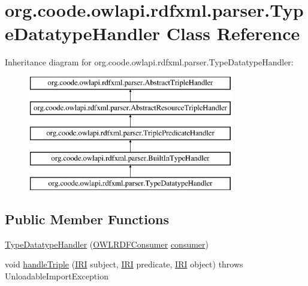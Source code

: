 \hypertarget{classorg_1_1coode_1_1owlapi_1_1rdfxml_1_1parser_1_1_type_datatype_handler}{\section{org.\-coode.\-owlapi.\-rdfxml.\-parser.\-Type\-Datatype\-Handler Class Reference}
\label{classorg_1_1coode_1_1owlapi_1_1rdfxml_1_1parser_1_1_type_datatype_handler}
}
Inheritance diagram for org.\-coode.\-owlapi.\-rdfxml.\-parser.\-Type\-Datatype\-Handler\-:\begin{figure}[H]
\begin{center}
\leavevmode
\includegraphics[height=5.000000cm]{classorg_1_1coode_1_1owlapi_1_1rdfxml_1_1parser_1_1_type_datatype_handler}
\end{center}
\end{figure}
\subsection*{Public Member Functions}
\begin{DoxyCompactItemize}
\item 
\hyperlink{classorg_1_1coode_1_1owlapi_1_1rdfxml_1_1parser_1_1_type_datatype_handler_ab3a164d87e8182a6b4516e6ec88aff40}{Type\-Datatype\-Handler} (\hyperlink{classorg_1_1coode_1_1owlapi_1_1rdfxml_1_1parser_1_1_o_w_l_r_d_f_consumer}{O\-W\-L\-R\-D\-F\-Consumer} \hyperlink{classorg_1_1coode_1_1owlapi_1_1rdfxml_1_1parser_1_1_abstract_triple_handler_a4ccf4d898ff01eb1cadfa04b23d54e9c}{consumer})
\item 
void \hyperlink{classorg_1_1coode_1_1owlapi_1_1rdfxml_1_1parser_1_1_type_datatype_handler_af1faf642a4ed7f4d6670721d9927fd31}{handle\-Triple} (\hyperlink{classorg_1_1semanticweb_1_1owlapi_1_1model_1_1_i_r_i}{I\-R\-I} subject, \hyperlink{classorg_1_1semanticweb_1_1owlapi_1_1model_1_1_i_r_i}{I\-R\-I} predicate, \hyperlink{classorg_1_1semanticweb_1_1owlapi_1_1model_1_1_i_r_i}{I\-R\-I} object)  throws Unloadable\-Import\-Exception 
\end{DoxyCompactItemize}
